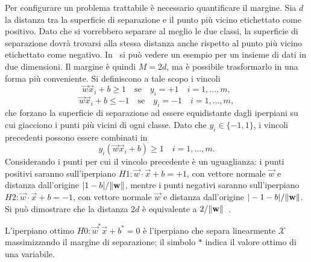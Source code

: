 Per configurare un problema trattabile è necessario quantificare il margine.
Sia $d$ la distanza tra la superficie di separazione e il punto più vicino etichettato come positivo. 
Dato che si vorrebbero separare al meglio le due classi, la superficie di separazione dovrà trovarsi alla stessa distanza anche rispetto al punto più vicino etichettato come negativo.
In~ si può vedere un esempio per un insieme di dati in due dimensioni.
Il margine è quindi $M=2d$, ma è possibile trasformarlo in una forma più conveniente.
Si definiscono a tale scopo i vincoli 
\begin{equation*}\label{eq:svc:hardmargin:margin_1}
    \Vec{w}\Vec{x}_i + b \geq 1 \quad \text{se} \quad y_i = +1 \quad  i=1,\dots,m,
\end{equation*}
\begin{equation*}
    \Vec{w}\Vec{x}_i + b \leq -1 \quad \text{se} \quad y_i = -1 \quad i=1,\dots,m,
\end{equation*}
che forzano la superficie di separazione ad essere equidistante dagli iperpiani su cui giacciono i punti più vicini di ogni classe.
Dato che $y_i\in\{-1,1\}$, i vincoli precedenti possono essere combinati in
\begin{equation*}
    y_i(\Vec{w}\Vec{x}_i + b) \geq 1 \quad i=1, ..., m.
\end{equation*}
Considerando i punti per cui il vincolo precedente è un uguaglianza: i punti positivi saranno sull'iperpiano $H1: \vec{w}\cdot \vec{x} + b=+1$, con vettore normale $\vec{w}$ e distanza dall'origine $|1-b|/\norm{\vec{w}}$, mentre i punti negativi saranno sull'iperpiano $H2: \vec{w}\cdot \vec{x} + b=-1$, con vettore normale $\vec{w}$ e distanza dall'origine $|-1-b|/\norm{\vec{w}}$. Si può dimostrare che la distanza $2d$ è equivalente a $2/\norm{\vec{w}}$~\cite{svm_tutorial}.

L'iperpiano ottimo $H0: \Vec{w}^*\Vec{x} + b^* = 0$ è l'iperpiano che separa linearmente $\mathcal{X}$ massimizzando il margine di separazione; il simbolo $*$ indica il valore ottimo di una variabile.

